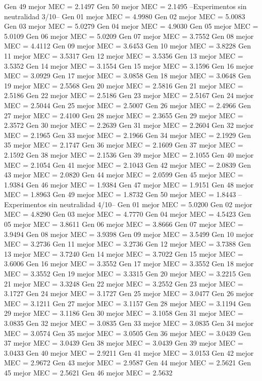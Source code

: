 Gen 49 mejor MEC = 2.1497
Gen 50 mejor MEC = 2.1495
--Experimentos sin neutralidad 3/10--
Gen 01 mejor MEC = 4.9980
Gen 02 mejor MEC = 5.0083
Gen 03 mejor MEC = 5.0279
Gen 04 mejor MEC = 4.9030
Gen 05 mejor MEC = 5.0109
Gen 06 mejor MEC = 5.0209
Gen 07 mejor MEC = 3.7552
Gen 08 mejor MEC = 4.4112
Gen 09 mejor MEC = 3.6453
Gen 10 mejor MEC = 3.8228
Gen 11 mejor MEC = 3.5317
Gen 12 mejor MEC = 3.5356
Gen 13 mejor MEC = 3.5352
Gen 14 mejor MEC = 3.1554
Gen 15 mejor MEC = 3.1596
Gen 16 mejor MEC = 3.0929
Gen 17 mejor MEC = 3.0858
Gen 18 mejor MEC = 3.0648
Gen 19 mejor MEC = 2.5568
Gen 20 mejor MEC = 2.5816
Gen 21 mejor MEC = 2.5186
Gen 22 mejor MEC = 2.5186
Gen 23 mejor MEC = 2.5167
Gen 24 mejor MEC = 2.5044
Gen 25 mejor MEC = 2.5007
Gen 26 mejor MEC = 2.4966
Gen 27 mejor MEC = 2.4100
Gen 28 mejor MEC = 2.3655
Gen 29 mejor MEC = 2.3572
Gen 30 mejor MEC = 2.2639
Gen 31 mejor MEC = 2.2604
Gen 32 mejor MEC = 2.1965
Gen 33 mejor MEC = 2.1966
Gen 34 mejor MEC = 2.1929
Gen 35 mejor MEC = 2.1747
Gen 36 mejor MEC = 2.1609
Gen 37 mejor MEC = 2.1592
Gen 38 mejor MEC = 2.1536
Gen 39 mejor MEC = 2.1055
Gen 40 mejor MEC = 2.1054
Gen 41 mejor MEC = 2.1043
Gen 42 mejor MEC = 2.0839
Gen 43 mejor MEC = 2.0820
Gen 44 mejor MEC = 2.0599
Gen 45 mejor MEC = 1.9384
Gen 46 mejor MEC = 1.9384
Gen 47 mejor MEC = 1.9151
Gen 48 mejor MEC = 1.8963
Gen 49 mejor MEC = 1.8732
Gen 50 mejor MEC = 1.8443
--Experimentos sin neutralidad 4/10--
Gen 01 mejor MEC = 5.0200
Gen 02 mejor MEC = 4.8290
Gen 03 mejor MEC = 4.7770
Gen 04 mejor MEC = 4.5423
Gen 05 mejor MEC = 3.8611
Gen 06 mejor MEC = 3.8666
Gen 07 mejor MEC = 3.9494
Gen 08 mejor MEC = 3.9398
Gen 09 mejor MEC = 3.5499
Gen 10 mejor MEC = 3.2736
Gen 11 mejor MEC = 3.2736
Gen 12 mejor MEC = 3.7388
Gen 13 mejor MEC = 3.7240
Gen 14 mejor MEC = 3.7022
Gen 15 mejor MEC = 3.6006
Gen 16 mejor MEC = 3.3552
Gen 17 mejor MEC = 3.3552
Gen 18 mejor MEC = 3.3552
Gen 19 mejor MEC = 3.3315
Gen 20 mejor MEC = 3.2215
Gen 21 mejor MEC = 3.3248
Gen 22 mejor MEC = 3.2552
Gen 23 mejor MEC = 3.1727
Gen 24 mejor MEC = 3.1727
Gen 25 mejor MEC = 3.0477
Gen 26 mejor MEC = 3.1211
Gen 27 mejor MEC = 3.1157
Gen 28 mejor MEC = 3.1194
Gen 29 mejor MEC = 3.1186
Gen 30 mejor MEC = 3.1058
Gen 31 mejor MEC = 3.0835
Gen 32 mejor MEC = 3.0835
Gen 33 mejor MEC = 3.0835
Gen 34 mejor MEC = 3.0574
Gen 35 mejor MEC = 3.0505
Gen 36 mejor MEC = 3.0439
Gen 37 mejor MEC = 3.0439
Gen 38 mejor MEC = 3.0439
Gen 39 mejor MEC = 3.0433
Gen 40 mejor MEC = 2.9211
Gen 41 mejor MEC = 3.0153
Gen 42 mejor MEC = 2.9672
Gen 43 mejor MEC = 2.9587
Gen 44 mejor MEC = 2.5621
Gen 45 mejor MEC = 2.5621
Gen 46 mejor MEC = 2.5632
